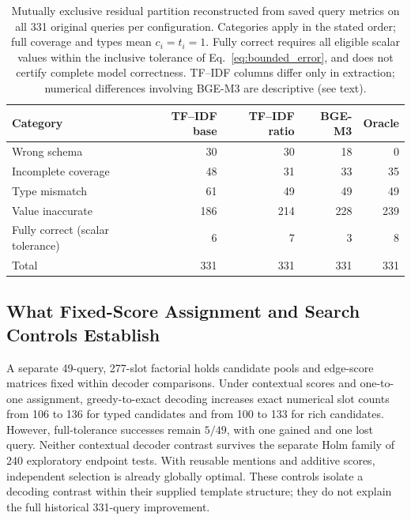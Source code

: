 \documentclass[pdflatex,sn-basic,Numbered]{sn-jnl}
\begin{document}
\begin{table}[t]
  \centering
  \caption{Mutually exclusive residual partition reconstructed from saved query metrics on all 331 original queries per configuration. Categories apply in the stated order; full coverage and types mean $c_i=t_i=1$. Fully correct requires all eligible scalar values within the inclusive tolerance of Eq.~\eqref{eq:bounded_error}, and does not certify complete model correctness. TF--IDF columns differ only in extraction; numerical differences involving BGE-M3 are descriptive (see text).}
  \label{tab:nlp4lp-error-taxonomy}
  \small
  \setlength{\tabcolsep}{4pt}
  \begin{tabular}{lrrrr}
    \toprule
    Category & TF--IDF base & TF--IDF ratio & BGE-M3 & Oracle \\
    \midrule
Wrong schema & 30 & 30 & 18 & 0 \\
Incomplete coverage & 48 & 31 & 33 & 35 \\
Type mismatch & 61 & 49 & 49 & 49 \\
Value inaccurate & 186 & 214 & 228 & 239 \\
Fully correct (scalar tolerance) & 6 & 7 & 3 & 8 \\
Total & 331 & 331 & 331 & 331 \\
    \bottomrule
  \end{tabular}
\end{table}
\subsection{What Fixed-Score Assignment and Search Controls Establish}
\label{subsec:grounding-followup}
A separate 49-query, 277-slot factorial holds candidate pools and edge-score matrices fixed within decoder comparisons. Under contextual scores and one-to-one assignment, greedy-to-exact decoding increases exact numerical slot counts from 106 to 136 for typed candidates and from 100 to 133 for rich candidates. However, full-tolerance successes remain $5/49$, with one gained and one lost query. Neither contextual decoder contrast survives the separate Holm family of 240 exploratory endpoint tests. With reusable mentions and additive scores, independent selection is already globally optimal. These controls isolate a decoding contrast within their supplied template structure; they do not explain the full historical 331-query improvement.
\end{document}

